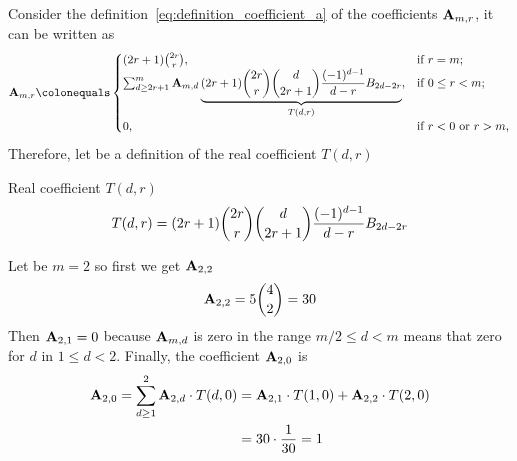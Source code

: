Consider the definition~\eqref{eq:definition_coefficient_a} of the coefficients ${\mathbf{A}} \sb{m,r}$, it can be written as
\begin{equation*}
    \coeffA{m}{r} \colonequals
    \begin{cases}
    (2r+1)
        \binom{2r}{r}, & \text{if } r=m; \\
        \sum_{d \geq 2r+1}^{m} \coeffA{m}{d} \underbrace{(2r+1) \binom{2r}{r} \binom{d}{2r+1} \frac{(-1)^{d-1}}{d-r} \bernoulli{2d-2r}}_{T(d,r)}, & \text{if } 0 \leq r<m; \\
        0, & \text{if } r<0 \text{ or } r>m,
    \end{cases}
\end{equation*}
Therefore, let be a definition of the real coefficient $T(d,r)$
\begin{defn}
    Real coefficient $T(d,r)$
    \begin{equation*}
        T(d,r) = (2r+1) \binom{2r}{r} \binom{d}{2r+1} \frac{(-1)^{d-1}}{d-r} {B}\sb{2d-2r}
    \end{equation*}
\end{defn}
\begin{examp}
    Let be $m=2$ so first we get ${\mathbf{A}} \sb{2,2}$
    \begin{equation*}
        {\mathbf{A}} \sb{2,2} = 5\binom{4}{2}=30
    \end{equation*}
    Then ${\mathbf{A}} \sb{2,1} = 0$ because ${\mathbf{A}} \sb{m,d}$ is zero in the range $m/2 \leq d < m$ means that zero for $d$
    in $1 \leq d < 2$.
    Finally, the coefficient ${\mathbf{A}} \sb{2,0}$ is
    \begin{equation*}
        \begin{split}
            {\mathbf{A}} \sb{2,0}
            = \sum_{d \geq 1}^{2} {\mathbf{A}} \sb{2,d} \cdot T(d, 0)
            &= {\mathbf{A}} \sb{2,1} \cdot T(1, 0) + {\mathbf{A}} \sb{2,2} \cdot T(2, 0) \\
            &= 30 \cdot \frac{1}{30} = 1
        \end{split}
    \end{equation*}
\end{examp}
